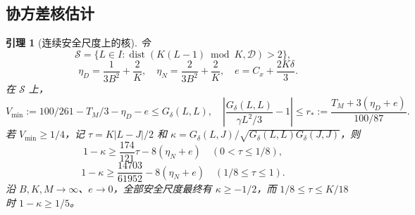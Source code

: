 \documentclass[UTF8,a4paper,11pt,fontset=fandol]{ctexart}
\newtheorem{lemma}{引理}[section]
\theoremstyle{remark}
\begin{document}
\subsection{协方差核估计}
\begin{lemma}[连续安全尺度上的核]\label{lem:paperkernel}
令
\[
 \mathcal S=\{L\in I:\operatorname{dist}(K(L-1)\bmod K,\mathcal D)>2\},
\]
\[
 \quad\eta_D=\frac1{3B^2}+\frac2K,\quad\eta_N=\frac2{3B^2}+\frac2K,
 \quad e=C_x+\frac{2K\delta}{3}.
\]
在 $\mathcal S$ 上，
\[
 V_{\min}:=100/261-T_M/3-\eta_D-e\le G_\delta(L,L),
 \quad\left|\frac{G_\delta(L,L)}{\gamma L^2/3}-1\right|
 \le r_*:=\frac{T_M+3(\eta_D+e)}{100/87}.
\]
若 $V_{\min}\ge1/4$，记 $\tau=K|L-J|/2$ 和
$\kappa=G_\delta(L,J)/\sqrt{G_\delta(L,L)G_\delta(J,J)}$，则
\[
 1-\kappa\ge\frac{174}{121}\tau-8(\eta_N+e)\quad(0<\tau\le1/8),
\]
\[
 1-\kappa\ge\frac{14703}{61952}-8(\eta_N+e)\quad(1/8\le\tau\le1).
\]
沿 $B,K,M\to\infty$、$e\to0$，全部安全尺度最终有
$\kappa\ge-1/2$，而 $1/8\le\tau\le K/18$ 时 $1-\kappa\ge1/5$。
\end{lemma}
\end{document}
